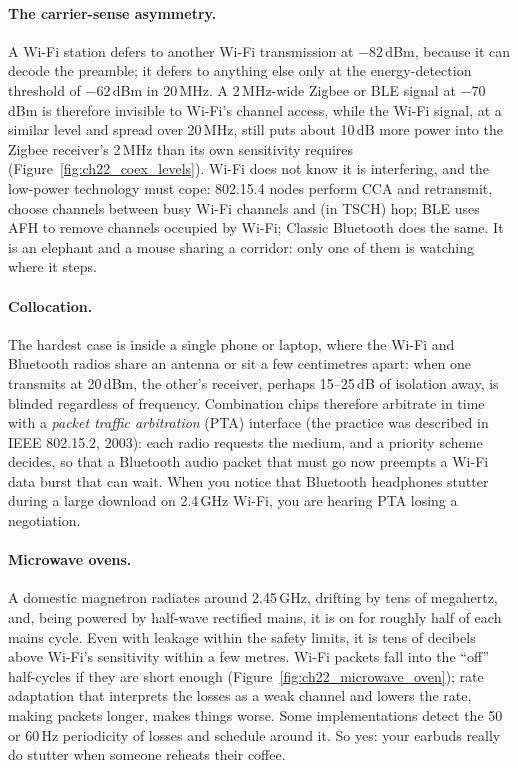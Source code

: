\paragraph{The carrier-sense asymmetry.} A Wi-Fi station defers to another Wi-Fi transmission at
$-82$\,dBm, because it can decode the preamble; it defers to anything else only at the
energy-detection threshold of $-62$\,dBm in 20\,MHz. A 2\,MHz-wide Zigbee or BLE signal at $-70$\,dBm
is therefore invisible to Wi-Fi's channel access, while the Wi-Fi signal, at a similar level and spread
over 20\,MHz, still puts about 10\,dB more power into the Zigbee receiver's 2\,MHz than its own
sensitivity requires (Figure~\ref{fig:ch22_coex_levels}). Wi-Fi does not know it is interfering, and
the low-power technology must cope: 802.15.4 nodes perform CCA and retransmit, choose channels between
busy Wi-Fi channels and (in TSCH) hop; BLE uses AFH to remove channels occupied by Wi-Fi; Classic
Bluetooth does the same. It is an elephant and a mouse sharing a corridor: only one of them is
watching where it steps.

\paragraph{Collocation.} The hardest case is inside a single phone or laptop, where the Wi-Fi and
Bluetooth radios share an antenna or sit a few centimetres apart: when one transmits at 20\,dBm, the
other's receiver, perhaps 15--25\,dB of isolation away, is blinded regardless of frequency.
Combination chips therefore arbitrate in time with a \emph{packet traffic arbitration} (PTA) interface
(the practice was described in IEEE 802.15.2, 2003): each radio requests the medium, and a priority
scheme decides, so that a Bluetooth audio packet that must go now preempts a Wi-Fi data burst that can
wait. When you notice that Bluetooth headphones stutter during a large download on 2.4\,GHz Wi-Fi, you
are hearing PTA losing a negotiation.

\paragraph{Microwave ovens.} A domestic magnetron radiates around 2.45\,GHz, drifting by tens of
megahertz, and, being powered by half-wave rectified mains, it is on for roughly half of each mains
cycle. Even with leakage within the safety limits, it is tens of decibels above Wi-Fi's sensitivity
within a few metres. Wi-Fi packets fall into the ``off'' half-cycles if they are short enough
(Figure~\ref{fig:ch22_microwave_oven}); rate adaptation that interprets the losses as a weak channel
and lowers the rate, making packets longer, makes things worse. Some implementations detect the 50 or
60\,Hz periodicity of losses and schedule around it. So yes: your earbuds really do stutter when
someone reheats their coffee.


